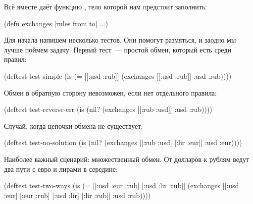 Всё вместе даёт функцию , тело которой нам предстоит заполнить:

\begin{english}
  \begin{clojure}
(defn exchanges
  [rules from to]
  ...)
  \end{clojure}
\end{english}


Для начала напишем несколько тестов. Они помогут размяться, и заодно мы лучше
поймем задачу. Первый тест~--- простой обмен, который есть среди правил:

\begin{english}
  \begin{clojure}
(deftest test-simple
  (is (= [[:usd :rub]]
         (exchanges [[:usd :rub]]
                    :usd
                    :rub))))
  \end{clojure}
\end{english}

Обмен в обратную сторону невозможен, если нет отдельного правила:

\begin{english}
  \begin{clojure}
(deftest test-reverse-err
  (is (nil? (exchanges [[:rub :usd]]
                       :usd
                       :rub))))
  \end{clojure}
\end{english}

Случай, когда цепочки обмена не существует:

\begin{english}
  \begin{clojure}
(deftest test-no-solution
  (is (nil? (exchanges [[:rub :usd]
                        [:lir :eur]]
                       :usd
                       :eur))))
  \end{clojure}
\end{english}

Наиболее важный сценарий: множественный обмен. От долларов к рублям ведут два
пути с евро и лирами в середине:

\begin{english}
  \begin{clojure}
(deftest test-two-ways
  (is (= [[:usd :eur :rub]
          [:usd :lir :rub]]
         (exchanges [[:usd :eur]
                     [:eur :rub]
                     [:usd :lir]
                     [:lir :rub]] :usd :rub))))
  \end{clojure}
\end{english}

